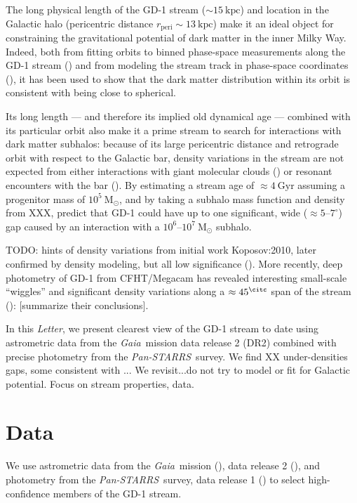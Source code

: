 \documentclass[modern]{aastex62}
\newcommand{\acronym}[1]{{\small{#1}}}
\newcommand{\gaia}{\textsl{Gaia}}
\newcommand{\pans}{\textsl{Pan-STARRS}}
\newcommand{\DR}{\acronym{DR2}}
\newcommand{\msun}{\textrm{M}_\odot}
\newcommand{\kpc}{\textrm{kpc}}
\newcommand{\article}{\textsl{Letter}}
\newcommand{\todo}[1]{{\color{red} TODO: #1}}
\begin{document}
The long physical length of the GD-1 stream ($\sim 15~\kpc$) and location in the
Galactic halo (pericentric distance $r_\textrm{peri} \sim 13~\kpc$) make it an
ideal object for constraining the gravitational potential of dark matter in the
inner Milky Way.
Indeed, both from fitting orbits to binned phase-space measurements along the
GD-1 stream (\citealt{Koposov:2010}) and from modeling the stream track in
phase-space coordinates (\citealt{Bovy:2016}), it has been used to show that the
dark matter distribution within its orbit is consistent with being close to
spherical.

Its long length --- and therefore its implied old dynamical age --- combined
with its particular orbit also make it a prime stream to search for interactions
with dark matter subhalos:
because of its large pericentric distance and retrograde orbit with respect to
the Galactic bar, density variations in the stream are not expected from either
interactions with giant molecular clouds (\citealt{Amorisco:2016}) or resonant
encounters with the bar (\citealt{Pearson:2017}).
By estimating a stream age of $\approx 4~\textrm{Gyr}$ assuming a progenitor
mass of $10^5~\msun$, and by taking a subhalo mass function and density from
XXX, \citet{Erkal:2016} predict that GD-1 could have up to one significant, wide
($\approx 5$--$7^\circ$) gap caused by an interaction with a
$10^6$--$10^7~\msun$ subhalo.

\todo{hints of density variations} from initial work Koposov:2010, later confirmed by density modeling, but all low significance
(\citealt{Carlberg:2013}).
More recently, deep photometry of GD-1 from CFHT/Megacam has revealed
interesting small-scale ``wiggles'' and significant density variations along a $\approx 45^\citc$ span of the stream (\citealt{DeBoer:2017}):
[summarize their conclusions].

In this \article, we present clearest view of the GD-1 stream to date using
astrometric data from the \gaia\ mission data release 2 (\DR) combined with
precise photometry from the \pans\ survey.
We find XX under-densities gaps, some consistent with ...
We revisit...do not try to model or fit for Galactic potential.
Focus on stream properties, data.

\section{Data}
\label{sec:data}

We use astrometric data from the \gaia\ mission (\citealt{Prusti:2016}), data
release 2 (\citealt{Gaia-Collaboration:2018, Lindegren:2018}), and photometry
from the \pans\ survey, data release 1 (\citealt{Chambers:2016}) to select
high-confidence members of the GD-1 stream.
\end{document}

